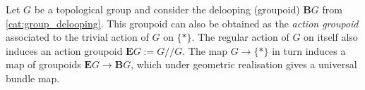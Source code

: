     \begin{construct}
        Let $G$ be a topological group and consider the delooping (groupoid) $\mathbf{B}G$ from \cref{cat:group_delooping}. This groupoid can also be obtained as the \textit{action groupoid} associated to the trivial action of $G$ on $\{\ast\}$. The regular action of $G$ on itself also induces an action groupoid $\mathbf{E}G:=G/\!/G$. The map $G\rightarrow\{\ast\}$ in turn induces a map of groupoids $\mathbf{E}G\rightarrow\mathbf{B}G$, which under geometric realisation gives a universal bundle map.
    \end{construct}